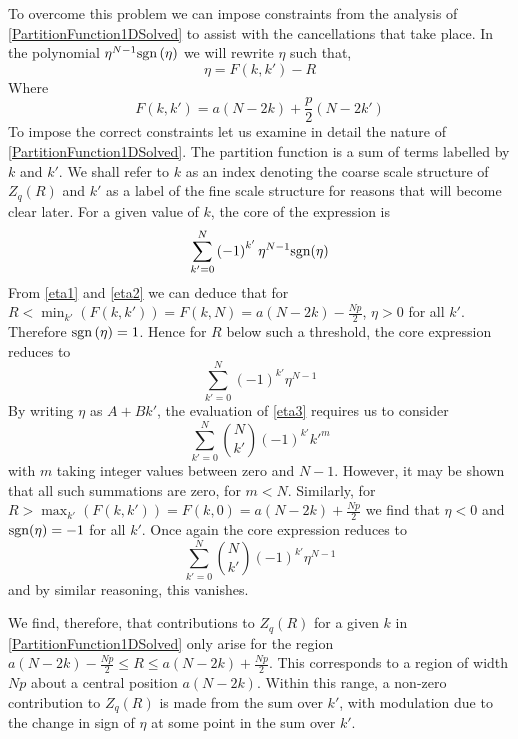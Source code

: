 To overcome this problem we can impose constraints from the analysis of \eqref{PartitionFunction1DSolved} to assist with the cancellations that take place. In the polynomial $\eta^{N-1}\text{sgn}\left(\eta\right)$ we will rewrite $\eta$ such that,
%
\begin{equation}\label{eta1}
\eta=F(k,k')-R\end{equation}
%
Where
%
\begin{equation}
F(k,k')=a(N-2k)+\frac{p}{2}(N-2k')\label{Adjustment1}
\end{equation}
%
To impose the correct constraints let us examine in detail the nature of \eqref{PartitionFunction1DSolved}. The partition function is a sum of terms labelled by $k$ and $k'$. We shall refer to $k$ as an index denoting the coarse scale structure of $Z_{q}(R)$ and $k'$ as a label of the fine scale structure for reasons that will become clear later. For a given value of $k$, the core of the expression is
%
\begin{equation}\label{eta2}
\sum_{k'=0}^{N}\left(-1\right)^{k'}\eta^{N-1}\text{sgn} (\eta)
\end{equation}
%
From \eqref{eta1} and \eqref{eta2} we can deduce that for $R < \min_{k'}(F(k,k')) = F(k,N) = a(N-2k)-\frac{Np}{2}$, $\eta > 0$ for all $k'$. Therefore $\text{sgn}\left(\eta\right) = 1$. Hence for $R$ below such a threshold, the core expression reduces to
%
\begin{equation}\label{eta3}
\sum_{k'=0}^{N}\left(-1\right)^{k'}\eta^{N-1}
\end{equation}
%
By writing $\eta$ as $A+Bk'$, the evaluation of \eqref{eta3} requires us to consider
%
\begin{equation}
\sum^{N}_{k'=0}\binom{N}{k'}\left(-1\right)^{k'}k'^{m} 
\end{equation} 
%
with $m$ taking integer values between zero and $N-1$. However, it may be shown that all such summations are zero, for $m < N$. Similarly, for $R> \max_{k'}(F(k,k'))=F(k,0)=a(N-2k)+\frac{Np}{2}$ we find that $\eta<0$ and $\text{sgn}(\eta)=-1$ for all $k'$. Once again the core expression reduces to
%
\begin{equation}
\sum^{N}_{k'=0}\binom{N}{k'}\left(-1\right)^{k'}\eta^{N-1}
\end{equation}
%
and by similar reasoning, this vanishes.

We find, therefore, that contributions to $Z_{q}\left(R\right)$ for a given $k$ in \eqref{PartitionFunction1DSolved} only arise for the region $a(N-2k)-\frac{Np}{2}\leq R \leq a(N-2k)+\frac{Np}{2}$. This corresponds to a region of width $Np$ about a central position $a(N-2k)$. Within this range, a non-zero contribution to $Z_{q}\left(R\right)$ is made from the sum over $k'$, with modulation due to the change in sign of $\eta$ at some point in the sum over $k'$.

